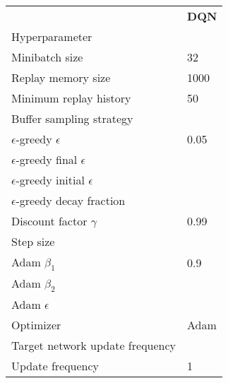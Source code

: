 \begin{tabular}{ll}
 & \bfseries DQN \\
Hyperparameter &  \\
Minibatch size & 32 \\
Replay memory size & 1000 \\
Minimum replay history & 50 \\
Buffer sampling strategy &  \\
$\epsilon$-greedy $\epsilon$ & 0.05 \\
$\epsilon$-greedy final $\epsilon$ &  \\
$\epsilon$-greedy initial $\epsilon$ &  \\
$\epsilon$-greedy decay fraction &  \\
Discount factor $\gamma$ & 0.99 \\
Step size &  \\
Adam $\beta_1$ & 0.9 \\
Adam $\beta_2$ &  \\
Adam $\epsilon$ &  \\
Optimizer & Adam \\
Target network update frequency &  \\
Update frequency & 1 \\
\end{tabular}
